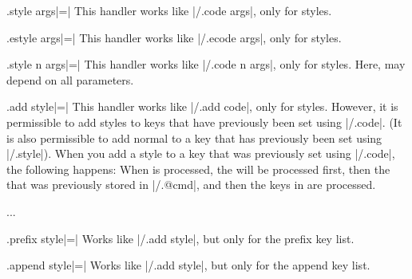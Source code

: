 
\begin{handler}{{.style args}|=|}
  This handler works like |/.code args|, only for styles.
\end{handler}

\begin{handler}{{.estyle args}|=|}
  This handler works like |/.ecode args|, only for styles.
\end{handler}

\begin{handler}{{.style n args}|=|}
	This handler works like |/.code n args|, only for styles. Here,  may depend on all  parameters.
\end{handler}

\begin{handler}{{.add style}|=|}
  This handler works like |/.add code|, only for styles. However, it is
  permissible to add styles to keys that have previously been set
  using  |/.code|. (It is also permissible to add normal  to
  a key that has previously been set using |/.style|). When you add a
  style to a key that was previously set using |/.code|, the following
  happens: When  is processed, the 
  will be processed first, then the  that was previously
  stored in |/.@cmd|, and then the keys in  are processed.
\begin{codeexample}
...
\end{codeexample}
\end{handler}

\begin{handler}{{.prefix style}|=|}
  Works like |/.add style|, but only for the prefix key list.
\end{handler}

\begin{handler}{{.append style}|=|}
  Works like |/.add style|, but only for the append key list.
\end{handler}


